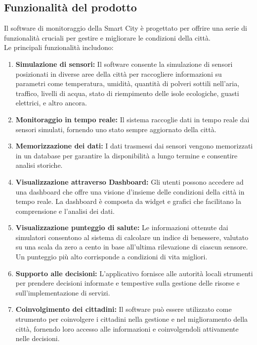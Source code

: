 \subsection{Funzionalità del prodotto}

Il software di monitoraggio della Smart City è progettato per offrire una serie di funzionalità cruciali per gestire e migliorare le condizioni della città. \\
Le principali funzionalità includono:

\begin{enumerate}
    \item \textbf{Simulazione di sensori:} Il software consente la simulazione di sensori posizionati in diverse aree della città per raccogliere informazioni su parametri come temperatura, umidità, quantità di polveri sottili nell’aria, traffico, livelli di acqua, stato di riempimento delle isole ecologiche, guasti elettrici, e altro ancora.

    \item \textbf{Monitoraggio in tempo reale:} Il sistema raccoglie dati in tempo reale dai sensori simulati, fornendo uno stato sempre aggiornato della città.

    \item \textbf{Memorizzazione dei dati:} I dati trasmessi dai sensori vengono memorizzati in un database per garantire la disponibilità a lungo termine e consentire analisi storiche.

    \item \textbf{Visualizzazione attraverso Dashboard:} Gli utenti possono accedere ad una dashboard che offre una visione d’insieme delle condizioni della città in tempo reale. La dashboard è composta da widget e grafici che facilitano la comprensione e l'analisi dei dati.

    \item \textbf{Visualizzazione punteggio di salute:} Le informazioni ottenute dai simulatori consentono al sistema di calcolare un indice di benessere, valutato su una scala da zero a cento in base all'ultima rilevazione di ciascun sensore. Un punteggio più alto corrisponde a condizioni di vita migliori.

    \item \textbf{Supporto alle decisioni:} L'applicativo fornisce alle autorità locali strumenti per prendere decisioni informate e tempestive sulla gestione delle risorse e sull'implementazione di servizi.

    \item \textbf{Coinvolgimento dei cittadini:} Il software può essere utilizzato come strumento per coinvolgere i cittadini nella gestione e nel miglioramento della città, fornendo loro accesso alle informazioni e coinvolgendoli attivamente nelle decisioni.

\end{enumerate}
